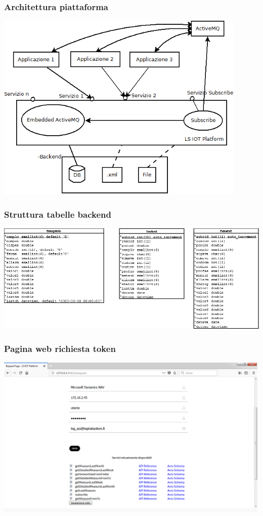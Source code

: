 \documentclass{beamer}
\begin{document}
\begin{frame}
\frametitle{Architettura piattaforma}
\includegraphics[width=0.9\textwidth]{images/architettura_piattaforma.png}
\end{frame}

\begin{frame}
\frametitle{Struttura tabelle backend}
\includegraphics[width=1\textwidth]{images/tabelle-backend.png}
\end{frame}

\begin{frame}
\frametitle{Pagina web richiesta token}
\includegraphics[width=1\textwidth]{images/RequestPagePlatform.png}
\end{frame}
\end{document}
